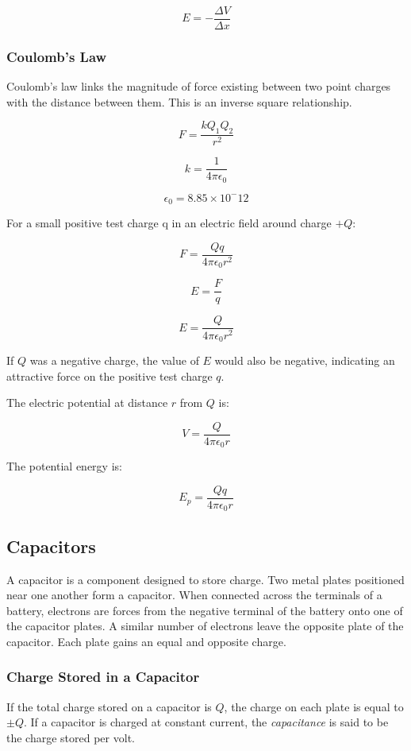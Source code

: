 \documentclass[12pt]{article}
\begin{document}
\[E = - \dfrac{\Delta V}{ \Delta x}\]

\subsubsection{Coulomb's Law}
\label{sec:org50f3bfe}

Coulomb's law links the magnitude of force existing between two point charges with the distance between them. This is an inverse square relationship.

\[F = \dfrac{kQ_1Q_2}{r^2}\]

\[k = \dfrac{1}{4 \pi \epsilon_0}\]

\[\epsilon_0 = 8.85 \times 10^-12 \]

For a small positive test charge q in an electric field around charge \(+Q\):


\[F = \dfrac{Qq}{4 \pi \epsilon_0r^2}\]

\[E = \dfrac{F}{q}\]

\[E = \dfrac{Q}{4 \pi \epsilon_0r^2}\]

If \(Q\) was a negative charge, the value of \(E\) would also be negative, indicating an attractive force on the positive test charge \(q\).

The electric potential at distance \(r\) from \(Q\) is:

\[V = \dfrac{Q}{4 \pi \epsilon_0r}\]

The potential energy is:

\[E_p = \dfrac{Qq}{4 \pi \epsilon_0r}\]

\subsection{Capacitors}
\label{sec:orgf25760c}

A capacitor is a component designed to store charge. Two metal plates positioned near one another form a capacitor. When connected across the terminals of a battery, electrons are forces from the negative terminal of the battery onto one of the capacitor plates. A similar number of electrons leave the opposite plate of the capacitor. Each plate gains an equal and opposite charge.

\subsubsection{Charge Stored in a Capacitor}
\label{sec:orgd33a703}

If the total charge stored on a capacitor is \(Q\), the charge on each plate is equal to \(\pm Q\). If a capacitor is charged at constant current, the \emph{capacitance} is said to be the charge stored per volt.
\end{document}
